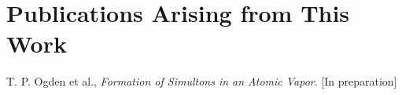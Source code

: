 \section{Publications Arising from This Work}
  \label{sec:intro_pubs}

  T. P. Ogden et al., \textit{Formation of Simultons in an Atomic Vapor}. [In preparation]